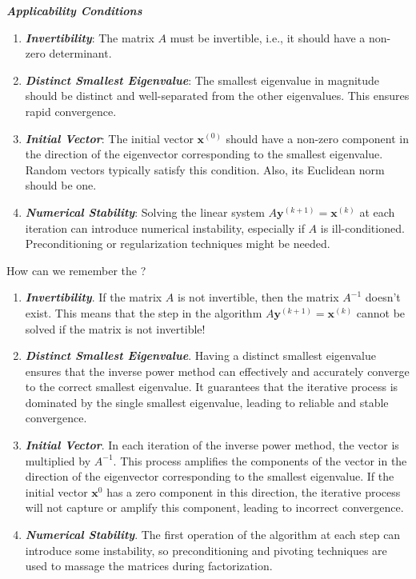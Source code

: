 \begin{enumerate}[label=\textcolor{Green3}{\textbf{\arabic*.}}]
    \textbf{\emph{Applicability Conditions}}
    \begin{enumerate}
        \item \textbf{\emph{Invertibility}}: The matrix $A$ must be invertible, i.e., it should have a non-zero determinant.
        \item \textbf{\emph{Distinct Smallest Eigenvalue}}: The smallest eigenvalue in magnitude should be distinct and well-separated from the other eigenvalues. This ensures rapid convergence.
        \item \textbf{\emph{Initial Vector}}: The initial vector $\mathbf{x}^{(0)}$ should have a non-zero component in the direction of the eigenvector corresponding to the smallest eigenvalue. Random vectors typically satisfy this condition. Also, its Euclidean norm should be one.
        \item \textbf{\emph{Numerical Stability}}: Solving the linear system $A \mathbf{y}^{(k+1)} = \mathbf{x}^{(k)}$ at each iteration can introduce numerical instability, especially if $A$ is ill-conditioned. Preconditioning or regularization techniques might be needed.
    \end{enumerate}

    \begin{tipbox}
        How can we remember the ?
        \begin{enumerate}
            \item \textbf{\emph{Invertibility}}. If the matrix $A$ is not invertible, then the matrix $A^{-1}$ doesn't exist. This means that the step in the algorithm $A\mathbf{y}^{\left(k+1\right)} = \mathbf{x}^{\left(k\right)}$ cannot be solved if the matrix is not invertible!
            \item \textbf{\emph{Distinct Smallest Eigenvalue}}. Having a distinct smallest eigenvalue ensures that the inverse power method can effectively and accurately converge to the correct smallest eigenvalue. It guarantees that the iterative process is dominated by the single smallest eigenvalue, leading to reliable and stable convergence.
            \item \textbf{\emph{Initial Vector}}. In each iteration of the inverse power method, the vector is multiplied by $A^{-1}$. This process amplifies the components of the vector in the direction of the eigenvector corresponding to the smallest eigenvalue. If the initial vector $\mathbf{x}^{0}$ has a zero component in this direction, the iterative process will not capture or amplify this component, leading to incorrect convergence.
            \item \textbf{\emph{Numerical Stability}}. The first operation of the algorithm at each step can introduce some instability, so preconditioning and pivoting techniques are used to massage the matrices during factorization.
        \end{enumerate}
    \end{tipbox}



\end{enumerate}
